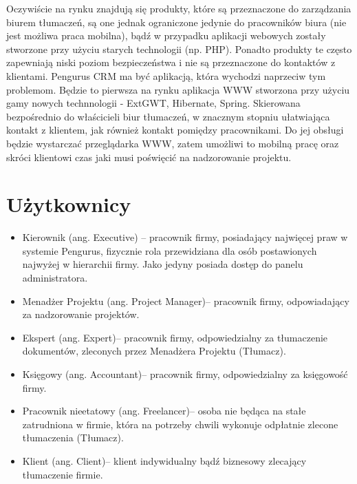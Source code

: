 \documentclass[licencjacka]{pracamgr}
\begin{document}
Oczywiście na rynku znajdują się produkty, które są przeznaczone do zarządzania biurem tłumaczeń, 
są one jednak ograniczone jedynie do pracowników biura (nie jest możliwa praca mobilna),
bądź w przypadku aplikacji webowych zostały stworzone przy użyciu starych technologii (np. PHP). 
Ponadto produkty te często zapewniają niski poziom bezpieczeństwa i nie są przeznaczone do kontaktów z klientami.
Pengurus CRM ma być aplikacją, która wychodzi naprzeciw tym problemom. 
Będzie to pierwsza na rynku aplikacja WWW stworzona przy użyciu gamy nowych technnologii - ExtGWT, Hibernate, Spring.
Skierowana bezpośrednio do właścicieli biur tłumaczeń, w znacznym stopniu ułatwiająca kontakt z klientem, jak również kontakt pomiędzy pracownikami. 
Do jej obsługi będzie wystarczać przeglądarka WWW, zatem umożliwi to mobilną pracę 
oraz skróci klientowi czas jaki musi poświęcić na nadzorowanie projektu. 

\section{Użytkownicy}
\begin{itemize}
\item Kierownik (ang. Executive) – pracownik firmy, posiadający najwięcej praw w systemie Pengurus, fizycznie rola przewidziana dla osób postawionych najwyżej w hierarchii firmy. Jako jedyny posiada dostęp do panelu administratora.
\item Menadżer Projektu (ang. Project Manager)– pracownik firmy, odpowiadający za nadzorowanie projektów.
\item Ekspert (ang. Expert)– pracownik firmy, odpowiedzialny za tłumaczenie dokumentów, zleconych przez Menadżera Projektu (Tłumacz).
\item Księgowy (ang. Accountant)– pracownik firmy, odpowiedzialny za księgowość firmy.
\item Pracownik nieetatowy (ang. Freelancer)– osoba nie będąca na stałe zatrudniona w firmie, która na potrzeby chwili wykonuje odpłatnie zlecone tłumaczenia (Tłumacz).
\item Klient (ang. Client)– klient indywidualny bądź biznesowy zlecający tłumaczenie firmie.
\end{itemize}
\end{document}
